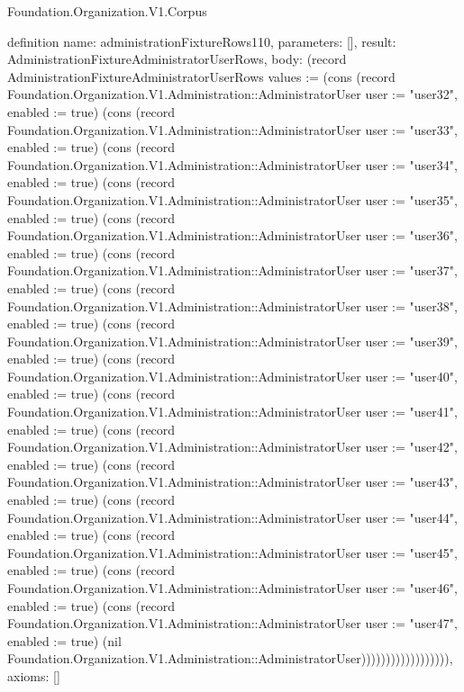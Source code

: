 \begin{lexlean}{Foundation.Organization.V1.Corpus}
\begin{semanticmodule}
definition{
  name: administrationFixtureRows110,
  parameters: [],
  result: AdministrationFixtureAdministratorUserRows,
  body: (record AdministrationFixtureAdministratorUserRows {values := (cons (record Foundation.Organization.V1.Administration::AdministratorUser {user := "user32", enabled := true}) (cons (record Foundation.Organization.V1.Administration::AdministratorUser {user := "user33", enabled := true}) (cons (record Foundation.Organization.V1.Administration::AdministratorUser {user := "user34", enabled := true}) (cons (record Foundation.Organization.V1.Administration::AdministratorUser {user := "user35", enabled := true}) (cons (record Foundation.Organization.V1.Administration::AdministratorUser {user := "user36", enabled := true}) (cons (record Foundation.Organization.V1.Administration::AdministratorUser {user := "user37", enabled := true}) (cons (record Foundation.Organization.V1.Administration::AdministratorUser {user := "user38", enabled := true}) (cons (record Foundation.Organization.V1.Administration::AdministratorUser {user := "user39", enabled := true}) (cons (record Foundation.Organization.V1.Administration::AdministratorUser {user := "user40", enabled := true}) (cons (record Foundation.Organization.V1.Administration::AdministratorUser {user := "user41", enabled := true}) (cons (record Foundation.Organization.V1.Administration::AdministratorUser {user := "user42", enabled := true}) (cons (record Foundation.Organization.V1.Administration::AdministratorUser {user := "user43", enabled := true}) (cons (record Foundation.Organization.V1.Administration::AdministratorUser {user := "user44", enabled := true}) (cons (record Foundation.Organization.V1.Administration::AdministratorUser {user := "user45", enabled := true}) (cons (record Foundation.Organization.V1.Administration::AdministratorUser {user := "user46", enabled := true}) (cons (record Foundation.Organization.V1.Administration::AdministratorUser {user := "user47", enabled := true}) (nil Foundation.Organization.V1.Administration::AdministratorUser)))))))))))))))))}),
  axioms: []
}


\end{semanticmodule}
\end{lexlean}
